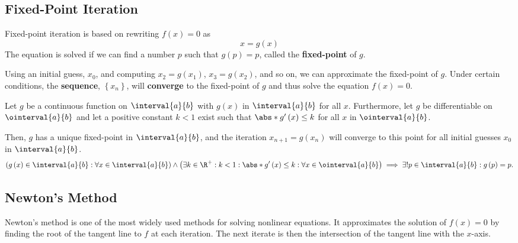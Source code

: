 \documentclass{article}
\begin{document}
\subsection{Fixed-Point Iteration}
Fixed-point iteration is based on rewriting \(f\left( x \right) = 0\) as
\begin{equation*}
    x = g\left( x \right)
\end{equation*}
The equation is solved if we can find a number \(p\) such that \(g\left( p \right) = p\),
called the \textbf{fixed-point} of \(g\).

Using an initial guess, \(x_0\), and computing \(x_2 = g\left( x_1 \right)\), \(x_3 = g\left( x_2 \right)\), and so on,
we can approximate the fixed-point of \(g\). Under certain conditions, the \textbf{sequence}, \(\left\{ x_n \right\}\),
will \textbf{converge} to the fixed-point of \(g\) and thus solve the equation \(f\left( x \right) = 0\).
\begin{theorem}
    Let \(g\) be a continuous function on \(\interval{a}{b}\) with \(g\left( x \right)\) in \(\interval{a}{b}\)
    for all \(x\). Furthermore, let \(g\) be differentiable on \(\ointerval{a}{b}\) and let a positive constant
    \(k < 1\) exist such that \(\abs*{g'\left( x \right)} \leq k\) for all \(x\) in \(\ointerval{a}{b}\).

    Then, \(g\) has a unique fixed-point in \(\interval{a}{b}\), and the iteration \(x_{n+1} = g\left( x_n \right)\)
    will converge to this point for all initial guesses \(x_0\) in \(\interval{a}{b}\).
    \begin{equation*}
        \left( g\left( x \right) \in \interval{a}{b} : \forall x \in \interval{a}{b} \right) \land \left( \exists k \in \R^+ : k < 1 : \abs*{g'\left( x \right)} \leq k : \forall x \in \ointerval{a}{b} \right) \implies \exists! p \in \interval{a}{b} : g\left( p \right) = p.
    \end{equation*}
\end{theorem}
\subsection{Newton's Method}
Newton's method is one of the most widely used methods for solving nonlinear equations.
It approximates the solution of \(f\left( x \right) = 0\) by finding the root of the tangent line to \(f\) at
each iteration. The next iterate is then the intersection of the tangent line with the \(x\)-axis.
\end{document}
